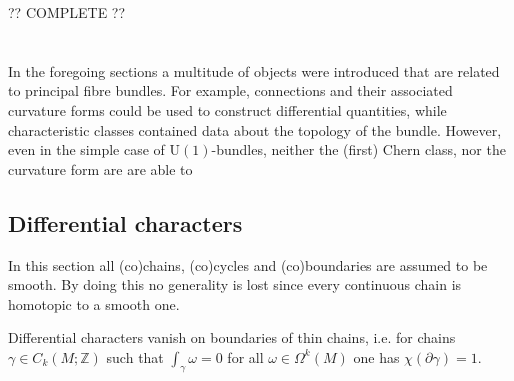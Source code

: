     ?? COMPLETE ??

\section{}\label{section:differential_cohomology}

    In the foregoing sections a multitude of objects were introduced that are related to principal fibre bundles. For example, connections and their associated curvature forms could be used to construct differential quantities, while characteristic classes contained data about the topology of the bundle. However, even in the simple case of $\mathrm{U}(1)$-bundles, neither the (first) Chern class, nor the curvature form are are able to

\subsection{Differential characters}

    In this section all (co)chains, (co)cycles and (co)boundaries are assumed to be smooth. By doing this no generality is lost since every continuous chain is homotopic to a smooth one.


    \begin{property}
        Differential characters vanish on boundaries of thin chains, i.e. for chains $\gamma\in C_k(M;\mathbb{Z})$ such that $\int_\gamma\omega=0$ for all $\omega\in\Omega^k(M)$ one has $\chi(\partial\gamma)=1$.
    \end{property}

